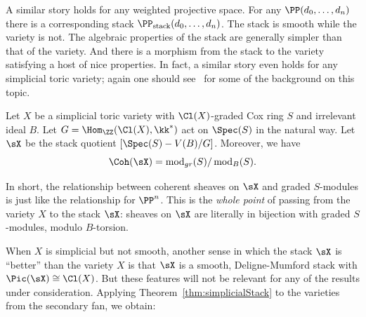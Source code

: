 A similar story holds for any weighted projective space.  For any $\PP(d_0, \dots, d_n)$ there is a corresponding stack $\PP_{\text{stack}}(d_0, \dots, d_n)$.  The stack is smooth while the variety is not.  The algebraic properties of the stack are generally simpler than that of the variety.  And there is a morphism from the stack to the variety satisfying a host of nice properties.  In fact, a similar story even holds for any simplicial toric variety; again one should see~\cite{BCS05} for some of the background on this topic.




\begin{thm}\label{thm:simplicialStack}
  Let $X$ be a simplicial toric variety with $\Cl(X)$-graded Cox ring $S$ and irrelevant ideal $B$.  Let $G=\Hom_{\ZZ}(\Cl(X),\kk^*)$ act on $\Spec(S)$ in the natural way.  Let $\sX$ be the stack quotient $[\Spec(S) - V(B) / G]$.  Moreover, we have
  \[
  \Coh(\sX) = \operatorname{mod}_{gr}(S)/\operatorname{mod}_{B}(S).
  \]
\end{thm}
In short, the relationship between coherent sheaves on $\sX$ and graded $S$-modules is just like the relationship for $\PP^n$.  This is the {\em whole point} of passing from the variety $X$ to the stack $\sX$: sheaves on $\sX$ are literally in bijection with graded $S$-modules, modulo $B$-torsion.


When $X$ is simplicial but not smooth, another sense in which the stack $\sX$ is ``better'' than the variety $X$ is that $\sX$ is a smooth, Deligne-Mumford stack with $\Pic(\sX) \cong \Cl(X)$.  But these features  will not be relevant for any of the results under consideration.  Applying Theorem~\ref{thm:simplicialStack} to the varieties from the secondary fan, we obtain:

